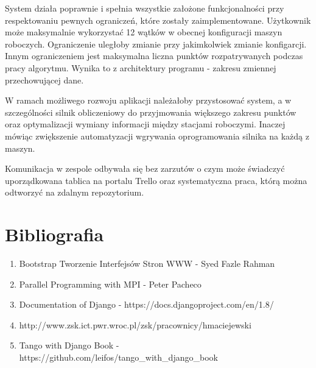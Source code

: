 \documentclass[a4paper,12pt]{article}		%
\begin{document}
System działa poprawnie i spełnia wszystkie założone funkcjonalności przy respektowaniu pewnych ograniczeń, które zostały zaimplementowane. Użytkownik może maksymalnie wykorzystać 12 wątków w obecnej konfiguracji maszyn roboczych. Ograniczenie uległoby zmianie przy jakimkolwiek zmianie konfigarcji. Innym ograniczeniem jest maksymalna liczna punktów rozpatrywanych podczas pracy algorytmu. Wynika to z architektury programu - zakresu zmiennej przechowującej dane. 

W ramach możliwego rozwoju aplikacji należałoby przystosować system, a w szczególności silnik obliczeniowy do przyjmowania większego zakresu punktów oraz optymalizacji wymiany informacji między stacjami roboczymi. Inaczej mówiąc zwiększenie automatyzacji wgrywania oprogramowania silnika na każdą z maszyn.

Komunikacja w zespole odbywała się bez zarzutów o czym może świadczyć uporządkowana tablica na portalu Trello oraz systematyczna praca, którą można odtworzyć na zdalnym repozytorium.

\section{Bibliografia }

\begin{enumerate}
\item Bootstrap Tworzenie Interfejsów Stron WWW - Syed Fazle Rahman
\item Parallel Programming with MPI - Peter Pacheco
\item Documentation of Django - https://docs.djangoproject.com/en/1.8/
\item http://www.zsk.ict.pwr.wroc.pl/zsk/pracownicy/hmaciejewski
\item Tango with Django Book - https://github.com/leifos/tango\_with\_django\_book
\end{enumerate}
\end{document}
